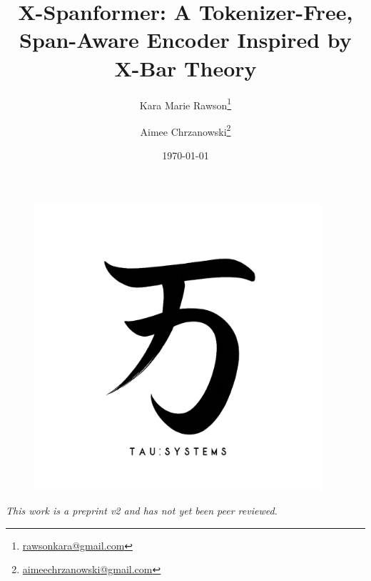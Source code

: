\documentclass[11pt]{article}
\title{\textbf{X-Spanformer: A Tokenizer-Free, Span-Aware Encoder Inspired by X-Bar Theory}}
\author{
	Kara Marie Rawson\thanks{\href{mailto:rawsonkara@gmail.com}{rawsonkara@gmail.com}} \and
	Aimee Chrzanowski\thanks{\href{mailto:aimeechrzanowski@gmail.com}{aimeechrzanowski@gmail.com}}
}
\date{\today}
\begin{document}
	
	\begin{figure}[H]
		\centering
		\includegraphics[width=0.95\textwidth]{figures/figure_00.png}
	\end{figure}
	\vspace{2em}
	
	\maketitle
	
	\begin{center}
		\textit{This work is a preprint v2 and has not yet been peer reviewed.}
	\end{center}
	
	
	
	
	
	
	
	
	
	
	
	
	\printbibliography
	
\end{document}
